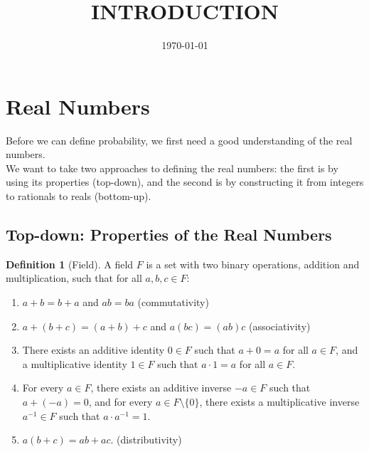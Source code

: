 \documentclass[letterpaper, 11pt]{article}
\newcommand{\1}{\mathds{1}}		%
\theoremstyle{definition}
\newtheorem{definition}[theorem]{Definition}
\begin{document}

\title{\normalsize\MakeUppercase{\bfseries 
Introduction}}
\date{\footnotesize\MakeUppercase\today}
\maketitle
\vspace{-1cm}


% 
% 

\section{Real Numbers}

Before we can define probability, we first need a good understanding of the real numbers. \\
We want to take two approaches to defining the real numbers: the first is by using its properties (top-down), and the second is by constructing it from integers to rationals to reals (bottom-up).

\subsection{Top-down: Properties of the Real Numbers}

\begin{definition}[Field]
    A field $F$ is a set with two binary operations, addition and multiplication, such that for all $a,b,c \in F$:
    \begin{enumerate}
        \item $a + b = b + a$ and $ab = ba$ (commutativity)
        \item $a + (b + c) = (a + b) + c$ and $a(bc) = (ab)c$ (associativity) 
        \item There exists an additive identity $0 \in F$ such that $a + 0 = a$ for all $a \in F$, and a multiplicative identity $1 \in F$ such that $a \cdot 1 = a$ for all $a \in F$.
        \item For every $a \in F$, there exists an additive inverse $-a \in F$ such that $a + (-a) = 0$, and for every $a \in F \setminus \{0\}$, there exists a multiplicative inverse $a^{-1} \in F$ such that $a \cdot a^{-1} = 1$.
        \item $a(b + c) = ab + ac$. (distributivity)
    \end{enumerate}
\end{definition}
\end{document}
